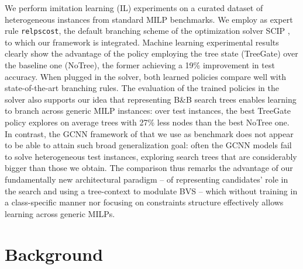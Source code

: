 \documentclass[letterpaper]{article} %
\begin{document}
We perform imitation learning (IL) experiments on a curated dataset of heterogeneous instances from standard MILP benchmarks. 
We employ as expert rule \texttt{relpscost}, the default branching scheme of the optimization solver SCIP \cite{GleixnerEtal2018ZR}, to which our framework is integrated. 
Machine learning experimental results clearly show the advantage of the policy employing the tree state (TreeGate) over the baseline one (NoTree), the former achieving a 19\% improvement in test accuracy. 
When plugged in the solver, both learned policies compare well with state-of-the-art branching rules. 
The evaluation of the trained policies in the solver also supports our idea that representing B\&B search trees enables learning to branch across generic MILP instances: over test instances, the best TreeGate policy explores on average trees with 27\% less nodes than the best NoTree one. 
In contrast, the GCNN framework of \citeauthor{NIPS2019_9690} that we use as benchmark does not appear to be able to attain such broad generalization goal: often the GCNN models fail to solve heterogeneous test instances, exploring search trees that are considerably bigger than those we obtain. 
The comparison thus remarks the advantage of our fundamentally new architectural paradigm -- of representing candidates’ role in the search and using a tree-context to modulate BVS -- which without training in a class-specific manner nor focusing on constraints structure effectively allows learning across generic MILPs.
 
\section{Background}
\label{sec:background}
\end{document}
